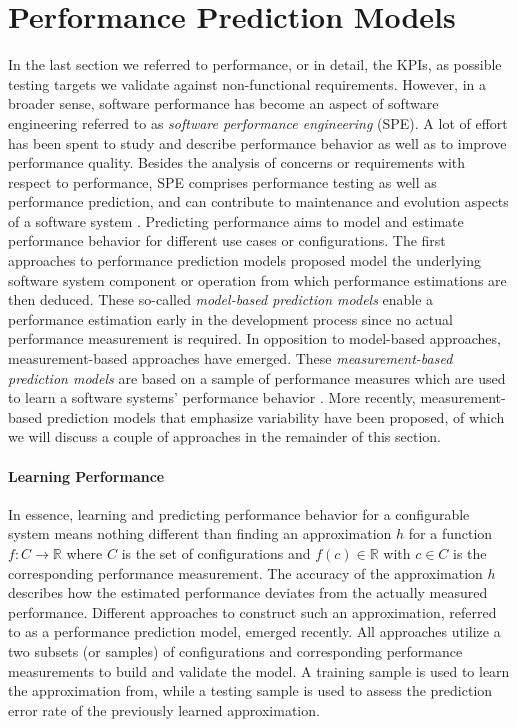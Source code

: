 \section{Performance Prediction Models}
\label{sec:performance-prediction-models} 
In the last section we referred to performance, or in detail, the KPIs, as
possible testing targets we validate against non-functional requirements.
However, in a broader sense, software performance has become an aspect of
software engineering referred to as \emph{software performance engineering}
(SPE).
A lot of effort has been spent to study and describe performance behavior as well
as to improve performance quality. Besides the analysis of concerns or
requirements with respect to performance, SPE comprises performance testing as
well as performance prediction, and can contribute to maintenance and evolution
aspects of a software system \citep{woodside_future_2007}. Predicting
performance aims to model and estimate performance behavior for different use cases or
configurations. The first approaches to performance prediction models proposed
model the underlying software system component or operation from which
performance estimations are then deduced. These so-called \emph{model-based prediction models} enable a
performance estimation early in the development process since no actual performance measurement is required. In opposition to
model-based approaches, measurement-based approaches have emerged. These
\emph{measurement-based prediction models} are based on a sample of performance
measures which are used to learn a software systems’ performance behavior
\citep{woodside_future_2007}. More recently, measurement-based prediction models that emphasize variability have been
proposed, of which we will discuss a couple of approaches in the remainder of
this section.

\paragraph{Learning Performance} In essence, learning and predicting performance
behavior for a configurable system means nothing different than finding an approximation $h$ for a function
$f: C \rightarrow \mathbb{R}$ where $C$ is the set of configurations and $f(c)
\in \mathbb{R}$ with $c \in C$ is the corresponding performance measurement. The
accuracy of the approximation $h$ describes how the estimated performance deviates from the actually measured
performance. Different approaches to construct such an approximation, referred
to as a performance prediction model, emerged recently. All approaches utilize
a two subsets (or samples) of configurations and corresponding performance
measurements to build and validate the model. A training sample is used to
learn the approximation from, while a testing sample is used to assess the
prediction error rate of the previously learned approximation. 

